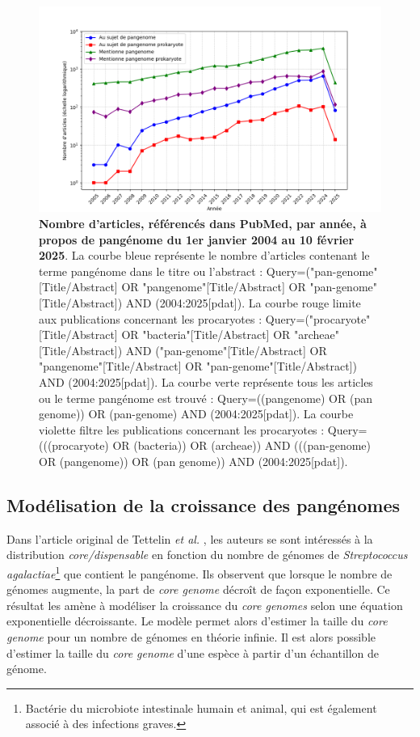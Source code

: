 \begin{figure}[htbp]
    \centering
    \includegraphics[width=\linewidth]{images/pangenomeCitation.png}
    \caption[Bibliométrie pangénome]{\textbf{Nombre d'articles, référencés dans PubMed, par année, à propos de pangénome du 1er janvier 2004 au 10 février 2025}. La courbe bleue représente le nombre d'articles contenant le terme pangénome dans le titre ou l'abstract : Query=("pan-genome"[Title/Abstract] OR "pangenome"[Title/Abstract] OR "pan-genome"[Title/Abstract]) AND (2004:2025[pdat]). La courbe rouge limite aux publications concernant les procaryotes : Query=("procaryote"[Title/Abstract] OR "bacteria"[Title/Abstract] OR "archeae"[Title/Abstract]) AND ("pan-genome"[Title/Abstract] OR "pangenome"[Title/Abstract] OR "pan-genome"[Title/Abstract]) AND (2004:2025[pdat]). La courbe verte représente tous les articles ou le terme pangénome est trouvé : Query=((pangenome) OR (pan genome)) OR (pan-genome) AND (2004:2025[pdat]). La courbe violette filtre les publications concernant les procaryotes : Query=(((procaryote) OR (bacteria)) OR (archeae)) AND (((pan-genome) OR (pangenome)) OR (pan genome)) AND (2004:2025[pdat]).}
    \label{fig:panCite}
\end{figure}

\newpage
\subsection{Modélisation de la croissance des pangénomes}
\label{sec:croissance_pan}

Dans l'article original de Tettelin \textit{et al.} \cite{tettelin_genome_2005}, les auteurs se sont intéressés à la distribution \textit{core/dispensable} en fonction du nombre de génomes de \textit{Streptococcus agalactiae}\footnote{Bactérie du microbiote intestinale humain et animal, qui est également associé à des infections graves.} que contient le pangénome. Ils observent que lorsque le nombre de génomes augmente, la part de \textit{core genome} décroît de façon exponentielle. Ce résultat les amène à modéliser la croissance du \textit{core genomes} selon une équation exponentielle décroissante. Le modèle permet alors d'estimer la taille du \textit{core genome} pour un nombre de génomes en théorie infinie. Il est alors possible d'estimer la taille du \textit{core genome} d'une espèce à partir d'un échantillon de génome. 


